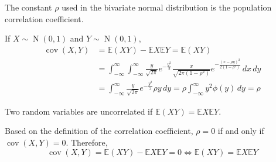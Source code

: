 \documentclass{huhtakm-template-book-v2}
\newcommand{\expect}{\mathbb{E}}
\DeclareMathOperator{\N}{N}
\DeclareMathOperator{\cov}{cov}
\begin{document}
    \begin{rem}
        The constant $\rho$ used in the bivariate normal distribution is the population correlation coefficient.
    \end{rem}
    \begin{eg}
        If $X \sim \N(0, 1)$ and $Y \sim \N(0, 1)$,
        \begin{align*}
            \cov(X, Y) &= \expect(XY)-\expect{X}\expect{Y} = \expect(XY)\\
            &= \int_{-\infty}^{\infty}\int_{-\infty}^{\infty}\frac{y}{\sqrt{2\pi}}e^{-\frac{y^{2}}{2}}\frac{x}{\sqrt{2\pi(1-\rho^{2})}}e^{-\frac{(x-\rho y)^{2}}{2(1-\rho^{2})}}\,dx\,dy\\
            &= \int_{-\infty}^{\infty}\frac{y}{\sqrt{2\pi}}e^{-\frac{y^{2}}{2}}\rho y\,dy = \rho\int_{-\infty}^{\infty} y^{2}\phi(y)\,dy = \rho
        \end{align*}
    \end{eg}
    \begin{lem}
        Two random variables are uncorrelated if $\expect(XY) = \expect{X}\expect{Y}$.
    \end{lem}
    \begin{proofing}
        Based on the definition of the correlation coefficient, $\rho = 0$ if and only if $\cov(X, Y) = 0$. Therefore,
        \begin{equation*}
            \cov(X, Y) = \expect(XY)-\expect{X}\expect{Y} = 0 \iff \expect(XY) = \expect{X}\expect{Y}
        \end{equation*}
    \end{proofing}
    \newpage
\end{document}
